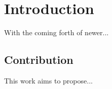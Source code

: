 \chapter{Introduction}
\label{ch:introduction}

With the coming forth of newer...


\section{Contribution}

This work aims to propose...

